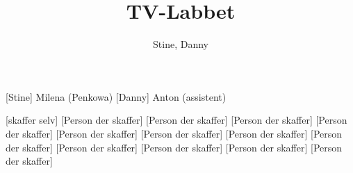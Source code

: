 \documentclass[a4paper,11pt]{article}
\title{TV-Labbet}
\author{Stine, Danny}
\begin{document}
\maketitle

\begin{roles}
    [Stine] Milena (Penkowa)
	[Danny] Anton (assistent)
\end{roles}

\begin{props}
	[skaffer selv]
	[Person der skaffer]
	[Person der skaffer]
	[Person der skaffer]
	[Person der skaffer]
	[Person der skaffer]
	[Person der skaffer]
	[Person der skaffer]
	[Person der skaffer]
	[Person der skaffer]
	[Person der skaffer]
	[Person der skaffer]
	[Person der skaffer]
\end{props}
\end{document}
